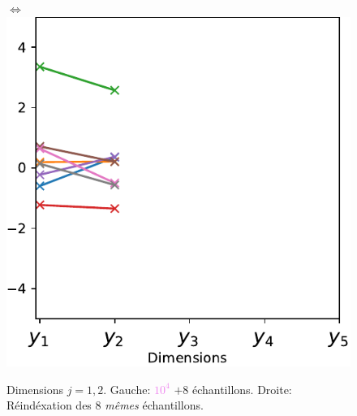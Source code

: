 \documentclass[xcolor=svgnames, t]{beamer}
\newcommand{\coloredemph}[1]{\textcolor{internationalblue}{\emph{#1}}}
\begin{document}
\begin{frame}{\subsecname}
\begin{figure}[ht]
    $\Longleftrightarrow$
    \includegraphics[scale=0.4]{gaussian_2d_valuevsindex.pdf}
    \caption{Dimensions $j=1, 2$. Gauche: \textcolor{violet}{$10^4$} $+8$ échantillons. 
    Droite: Réindéxation des $8$ \coloredemph{mêmes} échantillons.}
  \end{figure}
\end{frame}
\end{document}
